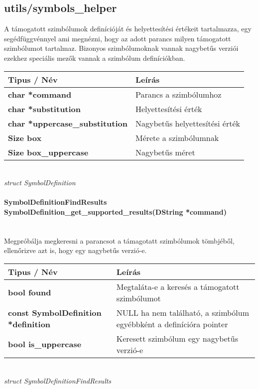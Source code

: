 \documentclass{article}[12pt,a4paper]
\newcommand{\fn}[1]{\paragraph{#1}\mbox{}\\}
\begin{document}
    \subsection{utils/symbols\_helper}
    A támogatott szimbólumok definícióját és helyettesítési értékeit tartalmazza, egy segédfüggvénnyel ami megnézni, hogy az adott parancs milyen támogatott szimbólumot tartalmaz.
    Bizonyos szimbólumoknak vannak nagybetűs verziói ezekhez speciális mezők vannak a szimbólum definíciókban.
    \begin{center}
        \begin{tabular}{ | p{5.5cm} || p{5.5cm} | }
            \hline
            \textbf{Tipus / Név} & Leírás \\
            \hline
            \textbf{char *command} & Parancs a szimbólumhoz\\
            \hline
            \textbf{char *substitution} & Helyettesítési érték\\
            \hline
            \textbf{char *uppercase\_substitution} & Nagybetűs helyettesítési érték\\
            \hline
            \textbf{Size box} & Mérete a szimbólumnak\\
            \hline
            \textbf{Size box\_uppercase} & Nagybetűs méret\\
            \hline
        \end{tabular}\\
        \textit{struct SymbolDefinition}
    \end{center}

    \fn{SymbolDefinitionFindResults SymbolDefinition\_get\_supported\_results(DString *command)}
    Megpróbálja megkeresni a parancsot a támagotatt szimbólumok tömbjéből, ellenőrizve azt is, hogy egy nagybetűs verzió-e.

    \begin{center}
        \begin{tabular}{ | p{5.5cm} || p{5.5cm} | }
            \hline
            \textbf{Tipus / Név} & Leírás \\
            \hline
            \textbf{bool found} & Megtaláta-e a keresés a támogatott szimbólumot\\
            \hline
            \textbf{const SymbolDefinition *definition} & NULL ha nem található, a szimbólum egyébbként a definícióra pointer\\
            \hline
            \textbf{bool is\_uppercase} & Keresett szimbólum egy nagybetűs verzió-e\\
            \hline
        \end{tabular}\\
        \textit{struct SymbolDefinitionFindResults}
    \end{center}
\end{document}
